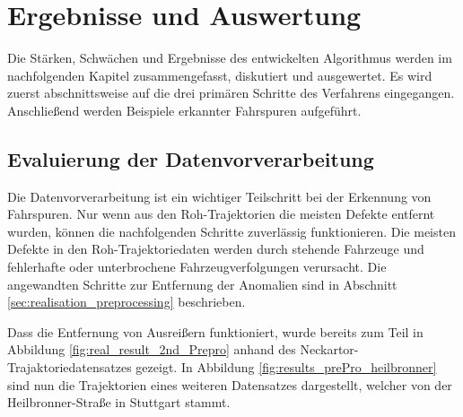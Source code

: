 
\chapter{Ergebnisse und Auswertung}
\label{cha:results}


Die Stärken, Schwächen und Ergebnisse des entwickelten Algorithmus werden im nachfolgenden Kapitel
zusammengefasst, diskutiert und ausgewertet. Es wird zuerst abschnittsweise auf die drei primären Schritte
des Verfahrens eingegangen. Anschließend werden Beispiele erkannter Fahrspuren aufgeführt.

\section{Evaluierung der Datenvorverarbeitung}



Die Datenvorverarbeitung ist ein wichtiger Teilschritt bei der Erkennung von Fahrspuren. Nur wenn aus
den Roh-Trajektorien die meisten Defekte entfernt wurden, können die nachfolgenden
Schritte zuverlässig funktionieren. Die meisten Defekte in den Roh-Trajektoriedaten werden durch stehende
Fahrzeuge und fehlerhafte oder unterbrochene Fahrzeugverfolgungen verursacht. Die angewandten Schritte zur
Entfernung der Anomalien sind in Abschnitt \ref{sec:realisation_preprocessing} beschrieben.

Dass die Entfernung von Ausreißern funktioniert, wurde bereits zum Teil in Abbildung
\ref{fig:real_result_2nd_Prepro} anhand des Neckartor-Trajaktoriedatensatzes gezeigt.
In Abbildung \ref{fig:results_prePro_heilbronner} sind nun die Trajektorien eines weiteren Datensatzes dargestellt,
welcher von der Heilbronner-Straße in Stuttgart stammt. 

